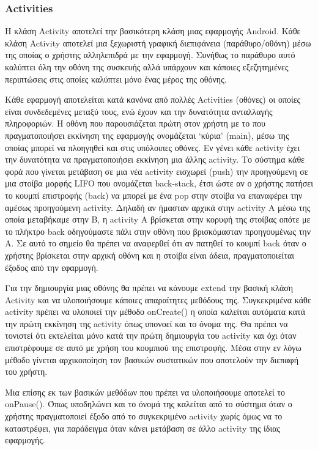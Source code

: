 		\subsubsection{Activities}
		Η κλάση Activity αποτελεί την βασικότερη κλάση μιας εφαρμογής Android. Κάθε κλάση Activity αποτελεί μια ξεχωριστή γραφική διεπιφάνεια (παράθυρο/οθόνη) μέσω της οποίας ο χρήστης αλληλεπιδρά με την εφαρμογή. Συνήθως το παράθυρο αυτό καλύπτει όλη την οθόνη της συσκευής αλλά υπάρχουν και κάποιες εξεζητημένες περιπτώσεις στις οποίες καλύπτει μόνο ένας μέρος της οθόνης.
		
		Κάθε εφαρμογή αποτελείται κατά κανόνα από πολλές Activities (οθόνες) οι οποίες είναι συνδεδεμένες μεταξύ τους, ενώ έχουν και την δυνατότητα ανταλλαγής πληροφοριών. Η οθόνη που παρουσιάζεται πρώτη στον χρήστη με το που πραγματοποιήσει εκκίνηση της εφαρμογής ονομάζεται `κύρια' (main), μέσω της οποίας μπορεί να πλοηγηθεί και στις υπόλοιπες οθόνες. Εν γένει κάθε activity έχει την δυνατότητα να πραγματοποιήσει εκκίνηση μια άλλης activity. Το σύστημα κάθε φορά που γίνεται μετάβαση σε μια νέα activity εισχωρεί (push) την προηγούμενη σε μια στοίβα μορφής LIFO που ονομάζεται back-stack, έτσι ώστε αν ο χρήστης πατήσει το κουμπί επιστροφής (back) να μπορεί με ένα pop στην στοίβα να επαναφέρει την αμέσως προηγούμενη activity. Δηλαδή αν ήμασταν αρχικά στην activity Α μέσω της οποία μεταβήκαμε στην Β, η activity Α βρίσκεται στην κορυφή της στοίβας οπότε με το πλήκτρο back οδηγούμαστε πάλι στην οθόνη που βρισκόμασταν προηγουμένως την Α. Σε αυτό το σημείο θα πρέπει να αναφερθεί ότι αν πατηθεί το κουμπί back όταν ο χρήστης βρίσκεται στην αρχική οθόνη και η στοίβα είναι άδεια, πραγματοποιείται έξοδος από την εφαρμογή.
		
		Για την δημιουργία μιας οθόνης θα πρέπει να κάνουμε extend την βασική κλάση Activity και να υλοποιήσουμε κάποιες απαραίτητες μεθόδους της. Συγκεκριμένα κάθε activity  πρέπει να υλοποιεί την μέθοδο onCreate() η οποία καλείται αυτόματα κατά την πρώτη εκκίνηση της activity όπως υπονοεί και το όνομα της. Θα πρέπει να τονιστεί ότι εκτελείται μόνο κατά την πρώτη δημιουργία του activity και όχι όταν επιστρέφουμε σε αυτό με χρήση του κουμπιού της επιστροφής. Μέσα στην εν λόγω μέθοδο γίνεται αρχικοποίηση τον βασικών συστατικών που αποτελούν την διεπαφή του χρήστη.
		
		Μια επίσης εκ των βασικών μεθόδων που πρέπει να υλοποιήσουμε αποτελεί το onPause(). Όπως υποδηλώνει και το όνομά της καλείται από το σύστημα όταν ο χρήστης πραγματοποιεί έξοδο από το συγκεκριμένο activity χωρίς όμως να το καταστρέφει, για παράδειγμα όταν κάνει μετάβαση σε άλλο activity της ίδιας εφαρμογής.
		
